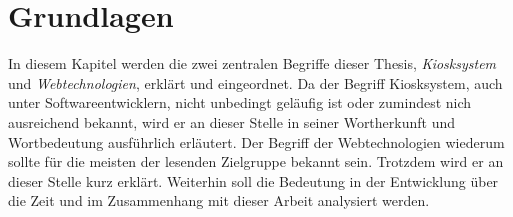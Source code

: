 \chapter{Grundlagen}
\label{chap:grundlagen}

In diesem Kapitel werden die zwei zentralen Begriffe dieser Thesis, \emph{Kiosksystem} und
\emph{Webtechnologien}, erklärt und eingeordnet. Da der Begriff
Kiosksystem, auch unter Softwareentwicklern, nicht unbedingt geläufig ist oder
zumindest nich ausreichend bekannt, wird er an dieser Stelle in seiner Wortherkunft
und Wortbedeutung ausführlich erläutert. Der Begriff der Webtechnologien wiederum sollte
für die meisten der lesenden Zielgruppe bekannt sein. 
Trotzdem wird er an dieser Stelle kurz erklärt. Weiterhin soll die Bedeutung in der Entwicklung 
über die Zeit und im Zusammenhang mit dieser Arbeit analysiert werden.


